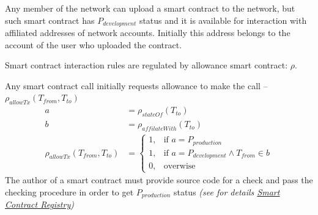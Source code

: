 \documentclass[12pt]{report}
\newcommand{\hlc}[1]{\colorbox{white!25}{#1}}
\begin{document}
Any member of the network can upload a smart contract to the network, but such smart contract has $P_{development}$ status and it is available for interaction with affiliated addresses of network accounts. Initially this address belongs to the account of the user who uploaded the contract.

Smart contract interaction rules are regulated by allowance smart contract: $\rho$.

Any smart contract call initially requests allowance to make the call – $\rho_{allowTx}(T_{from}, T_{to})$
\begin{align}
a &= \rho_{stateOf}(T_{to}) \nonumber\\
b &= \rho_{affilateWith}(T_{to}) \nonumber\\
\rho_{allowTx}(T_{from}, T_{to}) &= \begin{cases}1, & \text{if } a = P_{production} \\ 1, & \text{if } a = P_{development} \wedge T_{from} \in b \\ 0, & \text{overwise} \end{cases}
\end{align}
The author of a smart contract must provide source code for a check and pass the checking procedure in order to get $P_{production}$ status \textit{(see for details \hyperref[tech-apps-contracts-registry]{Smart Contract Registry})}

\def\Owner{Владелец контракта}
\def\Blockchain{Блокчейн}
\def\Registry{Реестр контрактов}
\def\LoadByteCode{Uploading byte code to blockchain}
\def\LoadSourceCode{Uploading source code}
\def\ValidationEnded{Code \hlc{Validation is} passed?}
\def\ChangeStatus{Changing smart contract state}
\end{document}
